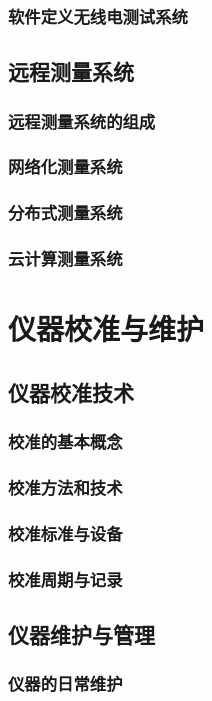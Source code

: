 \documentclass[12pt,UTF8]{ctexbook}
\begin{document}
\section{软件定义无线电测试系统}

\chapter{远程测量系统}
\section{远程测量系统的组成}
\section{网络化测量系统}
\section{分布式测量系统}
\section{云计算测量系统}

\part{仪器校准与维护}

\chapter{仪器校准技术}
\section{校准的基本概念}
\section{校准方法和技术}
\section{校准标准与设备}
\section{校准周期与记录}

\chapter{仪器维护与管理}
\section{仪器的日常维护}
\end{document}
